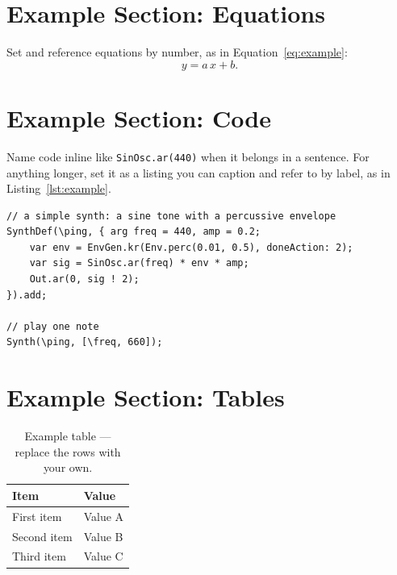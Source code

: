 \documentclass[sigconf, screen, nonacm]{acmart}
\begin{document}
\section{Example Section: Equations}
\lipsum[5]
Set and reference equations by number, as in Equation~\ref{eq:example}:
\begin{equation}
  y = a\,x + b .
  \label{eq:example}
\end{equation}


\section{Example Section: Code}

Name code inline like \lstinline|SinOsc.ar(440)| when it belongs in a
sentence. For anything longer, set it as a listing you can caption and
refer to by label, as in Listing~\ref{lst:example}.

\begin{lstlisting}[caption={Example SuperCollider code.}, label={lst:example}]
// a simple synth: a sine tone with a percussive envelope
SynthDef(\ping, { arg freq = 440, amp = 0.2;
    var env = EnvGen.kr(Env.perc(0.01, 0.5), doneAction: 2);
    var sig = SinOsc.ar(freq) * env * amp;
    Out.ar(0, sig ! 2);
}).add;

// play one note
Synth(\ping, [\freq, 660]);
\end{lstlisting}

\lipsum[2]


\section{Example Section: Tables}
\lipsum[6]

\begin{table}[h]
  \centering
  \caption{Example table --- replace the rows with your own.}
  \label{tab:example}
  \begin{tabular}{ll}
    \toprule
    Item & Value \\
    \midrule
    First item   & Value A \\
    Second item  & Value B \\
    Third item   & Value C \\
    \bottomrule
  \end{tabular}
\end{table}
\end{document}
